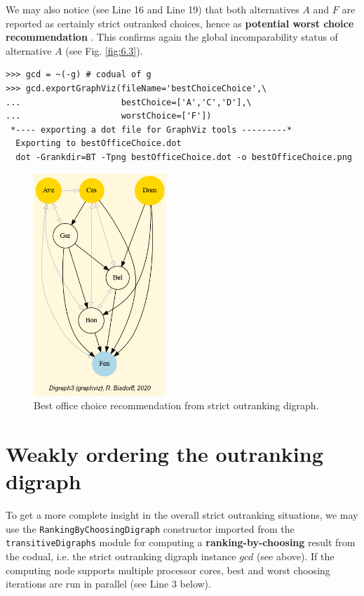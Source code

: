 We may also notice (see Line 16 and Line 19) that both alternatives $A$ and $F$ are reported as certainly strict outranked choices, hence as \textbf{potential worst choice recommendation} . This confirms again the global incomparability status of alternative $A$ (see Fig. \ref{fig:6.3}).

\begin{lstlisting}
>>> gcd = ~(-g) # codual of g
>>> gcd.exportGraphViz(fileName='bestChoiceChoice',\
...                    bestChoice=['A','C','D'],\
...                    worstChoice=['F'])
 *---- exporting a dot file for GraphViz tools ---------*
  Exporting to bestOfficeChoice.dot
  dot -Grankdir=BT -Tpng bestOfficeChoice.dot -o bestOfficeChoice.png
\end{lstlisting}

\begin{figure}[h]
\sidecaption
\includegraphics[width=5cm]{Figures/bestOfficeChoice.png}
\caption{Best office choice recommendation from strict outranking digraph.}
\label{fig:6.4}       %
\end{figure}

\section{Weakly ordering the outranking digraph}
\label{sec:6.6}

To get a more complete insight in the overall strict outranking situations, we may use the \texttt{RankingByChoosingDigraph} constructor imported from the \texttt{transitiveDigraphs} module for computing a \textbf{ranking-by-choosing} result from the codual, i.e. the strict outranking digraph instance $gcd$ (see above). If the computing node supports multiple processor cores, best and worst choosing iterations are run in parallel (see Line 3 below).

